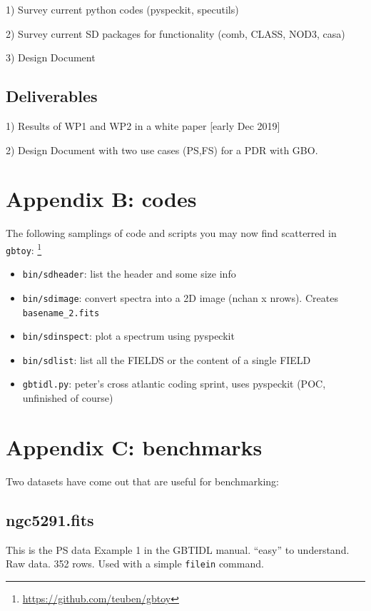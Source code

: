 \documentclass[12pt,a4paper]{article}
\begin{document}
1) Survey current python codes (pyspeckit, specutils)

2) Survey current SD packages for functionality (comb, CLASS, NOD3, casa)

3) Design Document

\subsection{Deliverables}

1) Results of WP1 and WP2 in a white paper [early Dec 2019]

2) Design Document with two use cases (PS,FS) for a PDR with GBO.

\section*{Appendix B: codes}

The following samplings of code and scripts you may now find scatterred in {\tt gbtoy}:
\footnote{\url{https://github.com/teuben/gbtoy}}

\begin{itemize}
  \item {\tt bin/sdheader}:  list the header and some size info
  \item {\tt bin/sdimage}:    convert spectra into a 2D image (nchan x nrows). Creates {\tt basename\_2.fits}
  \item {\tt bin/sdinspect}:  plot a spectrum using pyspeckit
  \item {\tt bin/sdlist}:  list all the FIELDS or the content of a single FIELD
  \item {\tt gbtidl.py}: peter's cross atlantic coding sprint, uses pyspeckit (POC, unfinished of course)
\end{itemize}       

\section*{Appendix C: benchmarks}

Two datasets have come out that are useful for benchmarking:

\subsection{ngc5291.fits}

This is the PS data Example 1 in the GBTIDL manual. ``easy'' to understand. Raw data. 352 rows.  Used with a simple {\tt filein} command.
\end{document}
